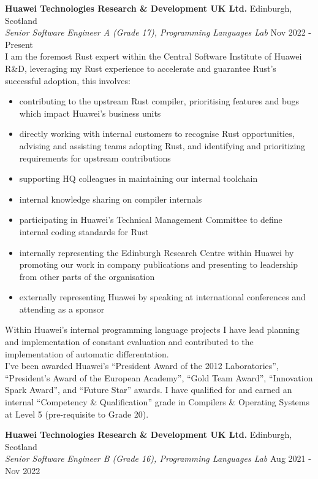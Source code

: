 \documentclass[a4paper]{article}
\begin{document}
\textbf{Huawei Technologies Research \& Development UK Ltd.} \hfill {\color{gray} Edinburgh, Scotland} \\
\textit{Senior Software Engineer A (Grade 17), Programming Languages Lab} \hfill {\color{gray} Nov 2022 - Present} \\
\vspace{2mm}
I am the foremost Rust expert within the Central Software Institute of Huawei R\&D, leveraging my
Rust experience to accelerate and guarantee Rust's successful adoption, this involves:
\begin{itemize}
  \item contributing to the upstream Rust compiler, prioritising features and bugs which impact
        Huawei's business units
  \item directly working with internal customers to recognise Rust opportunities, advising and
        assisting teams adopting Rust, and identifying and prioritizing requirements for upstream
        contributions
  \item supporting HQ colleagues in maintaining our internal toolchain
  \item internal knowledge sharing on compiler internals
  \item participating in Huawei's Technical Management Committee to define internal coding standards
        for Rust
  \item internally representing the Edinburgh Research Centre within Huawei by promoting our work in
        company publications and presenting to leadership from other parts of the organisation
  \item externally representing Huawei by speaking at international conferences and attending as a
        sponsor
\end{itemize}
Within Huawei's internal programming language projects I have lead planning and implementation of
constant evaluation and contributed to the implementation of automatic differentation. \\
\vspace{2mm}
I've been awarded Huawei's ``President Award of the 2012 Laboratories'', ``President's Award of the
European Academy'', ``Gold Team Award'', ``Innovation Spark Award'', and ``Future Star'' awards. I
have qualified for and earned an internal ``Competency \& Qualification'' grade in Compilers \&
Operating Systems at Level 5 (pre-requisite to Grade 20).
\vspace{2mm}

\textbf{Huawei Technologies Research \& Development UK Ltd.} \hfill {\color{gray} Edinburgh, Scotland} \\
\textit{Senior Software Engineer B (Grade 16), Programming Languages Lab} \hfill {\color{gray} Aug 2021 - Nov 2022} \\
\vspace{2mm}
\end{document}
